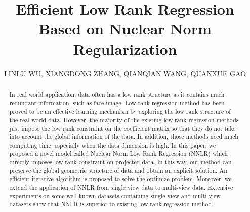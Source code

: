 \documentclass{ieeeaccess}
\begin{document}

\title{Efficient Low Rank Regression Based on Nuclear Norm Regularization}
\author{\uppercase{LinLu Wu},
           \uppercase{Xiangdong Zhang},
           \uppercase{QianQian Wang},
           \uppercase{QuanXue Gao}
}
\address[1]{State Key Laboratory of Integrated Services Networks, Xidian University, Xi'an 710071, China}

\begin{abstract}
In real world application, data often has a low rank structure as it contains much redundant information, such as face image. Low rank regression method has been proved to be an effective learning mechanism by exploring the low rank structure of the real world data. However, the majority of the existing low rank regression methods just impose the low rank constraint on the coefficient matrix so that they do not take into account the global information of the data. In addition, those methods need much computing time, especially when the data dimension is high. In this paper, we proposed a novel model called Nuclear Norm Low Rank Regression (NNLR) which directly imposes low rank constraint on projected data. In this way, our method can preserve the global geometric structure of data and obtain an explicit solution. An efficient iterative algorithm is proposed to solve the optimize problem. Moreover, we extend the application of NNLR from single view data to multi-view data. Extensive experiments on some well-known datasets containing single-view and multi-view datasets show that NNLR is superior to existing low rank regression method.
\end{abstract}
\end{document}
